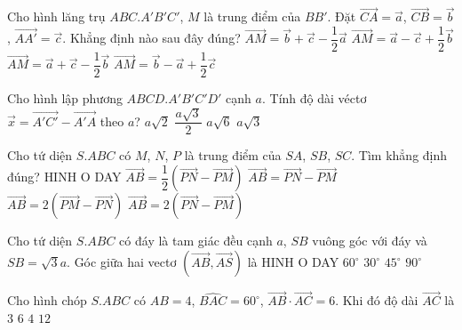 \begin{ex}
	Cho hình lăng trụ $ABC.A'B'C'$, $M$ là trung điểm của $BB'$. Đặt $\vec{CA}=\vec{a}$, $\vec{CB}=\vec{b}$, $\vec{AA'}=\vec{c}$. Khẳng định nào sau đây đúng?
	\choice
	{$\vec{AM}=\vec{b}+\vec{c}-\dfrac{1}{2}\vec{a}$}
	{$\vec{AM}=\vec{a}-\vec{c}+\dfrac{1}{2}\vec{b}$}
	{$\vec{AM}=\vec{a}+\vec{c}-\dfrac{1}{2}\vec{b}$}
	{\True $\vec{AM}=\vec{b}-\vec{a}+\dfrac{1}{2}\vec{c}$}
\end{ex}
\begin{ex}
	Cho hình lập phương $ABCD.A'B'C'D'$ cạnh $a$. Tính độ dài véctơ $\vec{x}=\vec{A'C'}-\vec{A'A}$ theo $a$?
	\choice
	{$a\sqrt{2}$}
	{$\dfrac{a\sqrt{3}}{2}$}
	{$a\sqrt{6}$}
	{\True $a\sqrt{3}$}
\end{ex}
\begin{ex}
	Cho tứ diện $S.ABC$ có $M$, $N$, $P$ là trung điểm của $SA$, $SB$, $SC$. Tìm khẳng định đúng?
	{\centering\color{red} HINH O DAY}
	\choice
	{$\vec{AB}=\dfrac{1}{2}\left(\vec{PN}-\vec{PM}\right)$}
	{$\vec{AB}=\vec{PN}-\vec{PM}$}
	{$\vec{AB}=2\left(\vec{PM}-\vec{PN}\right)$}
	{\True $\vec{AB}=2\left(\vec{PN}-\vec{PM}\right)$}
\end{ex}
\begin{ex}
	Cho tứ diện $S.ABC$ có đáy là tam giác đều cạnh $a$, $SB$ vuông góc với đáy và $SB=\sqrt{3}a$. Góc giữa hai vectơ $(\vec{AB},\vec{AS})$ là
	{\centering\color{red} HINH O DAY}
	\choice
	{\True $60^\circ$}
	{$30^\circ$}
	{$45^\circ$}
	{$90^\circ$}
\end{ex}
\begin{ex}
	Cho hình chóp $S.ABC$ có $AB=4$, $\widehat{BAC}=60^\circ$, $\vec{AB} \cdot \vec{AC}=6$. Khi đó độ dài $\vec{AC}$ là
	\choice
	{\True $3$}
	{$6$}
	{$4$}
	{$12$}
\end{ex}

